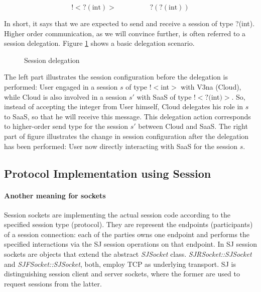 \documentclass{llncs}
\begin{document}
\begin{equation*}
!<?(\text{int})> \hspace{2cm} ?(?(\text{int}))
\end{equation*}

In short, it says that we are expected to send and receive a session of type ?(int). Higher order communication, as we will convince further, is often referred to a session delegation. Figure \ref{fig:sj-delegation} shows a basic delegation scenario.

\begin{figure}[ht]
\centering
{}
\caption{Session delegation}\label{fig:sj-delegation}
\end{figure}

The left part illustrates the session configuration before the delegation is performed: User engaged in a session $s$ of type $!<$int$>$ with V3na (Cloud), while Cloud is also involved in a session $s'$ with SaaS of type $!<?($int$)>$. So, instead of accepting the integer from User himself, Cloud delegates his role in $s$ to SaaS, so that he will receive this message. This delegation action corresponds to higher-order send type for the session $s'$ between Cloud and SaaS. The right part of figure illustrates the change in session configuration after the delegation has been performed: User now directly interacting with SaaS for the session $s$.

\subsection{Protocol Implementation using Session}
\paragraph{Another meaning for sockets}
Session sockets are implementing the actual session code according to the specified session type (protocol). They are represent the endpoints (participants) of a session connection: each of the parties owns one endpoint and performs the specified interactions via the SJ session operations on that endpoint. In SJ session sockets are objects that extend the abstract \textit{SJSocket} class. \textit{SJRSocket::SJSocket} and \textit{SJFSocket::SJSocket}, both, employ TCP as underlying transport. SJ is distinguishing session client and server sockets, where the former are used to request sessions from the latter.
\end{document}
